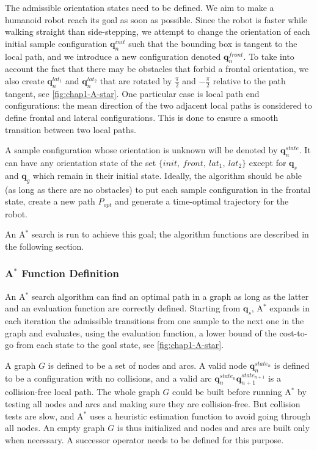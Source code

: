 The admissible orientation states need to be defined. We aim to make a
humanoid robot reach its goal as soon as possible. Since the robot is
faster while walking straight than side-stepping, we attempt to change
the orientation of each initial sample configuration
$\mathbf{q}_n^{init}$ such that the bounding box is tangent to the
local path, and we introduce a new configuration denoted
$\mathbf{q}_n^{front}$. To take into account the fact that there may
be obstacles that forbid a frontal orientation, we also create
$\mathbf{q}_n^{lat_1}$ and $\mathbf{q}_n^{lat_2}$ that are rotated by
$\frac{\pi}{2}$ and $-\frac{\pi}{2}$ relative to the path tangent, see
\autoref{fig:chap1-A-star}. One particular case is local path end
configurations: the mean direction of the two adjacent local paths is
considered to define frontal and lateral configurations. This is done
to ensure a smooth transition between two local paths.

A sample configuration whose orientation is unknown will be denoted by
$\mathbf{q}_n^{state}$. It can have any orientation state of the set
$\{init,~front,~lat_1,~lat_2\}$ except for $\mathbf{q}_s$ and
$\mathbf{q}_g$ which remain in their initial state.  Ideally, the
algorithm should be able (as long as there are no obstacles) to put
each sample configuration in the frontal state, create a new path
$P_{opt}$ and generate a time-optimal trajectory for the robot.

An A$^{*}$ search is run to achieve this goal; the algorithm functions are
described in the following section.

\subsubsection{A$^{*}$ Function Definition}
\label{sec:chap1-A-star}
An A$^{*}$ search algorithm can find an optimal path in a graph as
long as the latter and an evaluation function are correctly
defined. Starting from $\mathbf{q}_s$, A$^{*}$ expands in each
iteration the admissible transitions from one sample to the next one
in the graph and evaluates, using the evaluation function, a lower
bound of the cost-to-go from each state to the goal state, see
\autoref{fig:chap1-A-star}.

A graph $G$ is defined to be a set of nodes and arcs. A valid node
$\mathbf{q}_n^{state_n}$ is defined to be a configuration with no
collisions, and a valid arc
$\mathbf{q}_n^{state_n}\mathbf{q}_{n+1}^{state_{n+1}}$ is a
collision-free local path. The whole graph $G$ could be built before
running A$^{*}$ by testing all nodes and arcs and making sure they are
collision-free. But collision tests are slow, and A$^{*}$ uses a
heuristic estimation function to avoid going through all nodes. An
empty graph $G$ is thus initialized and nodes and arcs are built only
when necessary. A successor operator needs to be defined for this
purpose.

